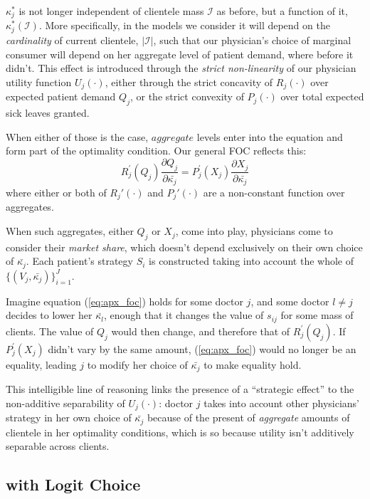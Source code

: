 \documentclass[../main.tex]{subfiles}
\begin{document}
$\kappa_j^*$ is not longer independent of clientele mass $\mathcal{I}$ as before, but a function of it, $\kappa_j^*(\mathcal{I})$. More specifically, in the models we consider it will depend on the \textit{cardinality} of current clientele, $|\mathcal{I}|$, such that our physician's choice of marginal consumer will depend on her aggregate level of patient demand, where before it didn't. This effect is introduced through the \textit{strict non-linearity} of our physician utility function $U_j(\cdot)$, either through the strict concavity of $R_j(\cdot)$ over expected patient demand $Q_j$, or the strict convexity of $P_j(\cdot)$ over total expected sick leaves granted.

When either of those is the case, $aggregate$ levels enter into the equation and form part of the optimality condition. Our general FOC reflects this:
\begin{equation}
 R_j^{\prime}(Q_j)\frac{\partial Q_j}{\partial\bar{\kappa_j}} = P_j^{\prime}(X_j)\frac{\partial X_j}{\partial \bar{\kappa_j}} 
 \label{eq:apx_foc}
\end{equation}
where either or both of $R_j'(\cdot)$ and $P_j'(\cdot)$ are a non-constant function over aggregates.

When such aggregates, either $Q_j$ or $X_j$, come into play, physicians come to consider their \textit{market share}, which doesn't depend exclusively on their own choice of $\bar{\kappa_j}$. Each patient's strategy $S_i$ is constructed taking into account the whole of $\{(V_j,\bar{\kappa_j})\}_{i =1}^{J}$.

Imagine equation (\ref{eq:apx_foc}) holds for some doctor $j$, and some doctor $l \neq j$ decides to lower her $\bar{\kappa_l}$, enough that it changes the value of $s_{ij}$ for some mass of clients. The value of $Q_j$ would then change, and therefore that of $ R_j^{\prime}(Q_j)$. If $P_j^{\prime}(X_j)$ didn't vary by the same amount, (\ref{eq:apx_foc}) would no longer be an equality, leading $j$ to modify her choice of $\bar{\kappa_j}$ to make equality hold.

This intelligible line of reasoning links the presence of a ``strategic effect'' to the non-additive separability of $U_j(\cdot)$: doctor $j$ takes into account other physicians' strategy in her own choice of $ \bar{\kappa_j}$ because of the present of \textit{aggregate} amounts of clientele in her optimality conditions, which is so because utility isn't additively separable across clients.

\subsection{\cite{schnell2017physician} with Logit Choice}
\label{sec:schnell_logit}
\end{document}
